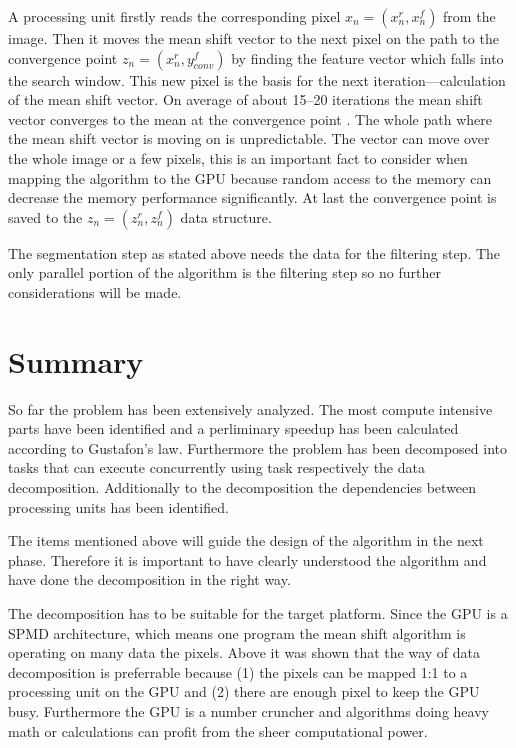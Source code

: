 A processing unit firstly reads the corresponding pixel $x_n = (x_n^r, x_n^f)$
from the image. Then it moves the mean shift vector to the next pixel on the
path to the convergence point $z_n = (x_n^r, y_{conv}^f)$ by finding the feature
vector which falls into the search window. This new pixel is the basis for the
next iteration---calculation of the mean shift vector. On average of about
15--20 iterations the mean shift vector converges to the mean at the convergence
point \citep{DBLP:conf/eccv/ZhangKT06}. The whole path where the mean shift
vector is moving on is unpredictable. The vector can move over the whole image
or a few pixels, this is an important fact to consider when mapping the
algorithm to the \gls{GPU} because random access to the memory can decrease the
memory performance significantly. At last the convergence point is saved to the
$z_n = (z_n^r, z_n^f)$ data structure.

The segmentation step as stated above needs the data for the filtering step. The
only parallel portion of the algorithm is the filtering step so no further 
considerations will be made. 

\section{Summary} %
\label{sec:summary}
So far the problem has been extensively analyzed. The most compute intensive
parts have been identified and a perliminary speedup has been calculated
according to Gustafon's law. Furthermore the problem has been decomposed into
tasks that can execute concurrently using task respectively the data
decomposition. Additionally to the decomposition the dependencies between
processing units has been identified. 

The items  mentioned above will guide the design of the algorithm in the next
phase. Therefore it is important to have clearly understood the algorithm and
have done the decomposition in the right way. 

The decomposition has to be suitable for the target platform. Since the
\gls{GPU} is a \gls{SPMD} architecture, which means one program the mean shift
algorithm is operating on many data the pixels. Above it was shown that the way
of data decomposition is preferrable because (1) the pixels can be mapped 1:1 to
a processing unit on the \gls{GPU} and (2) there are enough pixel to keep the
\gls{GPU} busy. Furthermore the \gls{GPU} is a number cruncher and algorithms
doing heavy math or calculations can profit from the sheer computational power.

